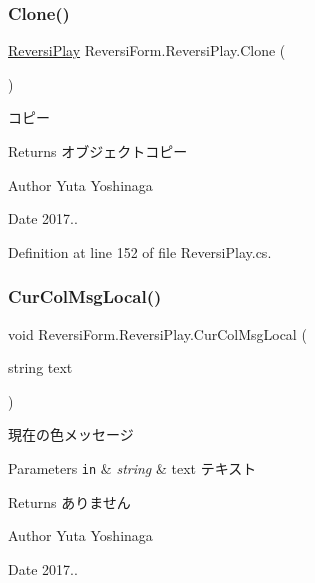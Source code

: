 \subsubsection{\texorpdfstring{Clone()}{Clone()}}
{\footnotesize\ttfamily \hyperlink{class_reversi_form_1_1_reversi_play}{Reversi\+Play} Reversi\+Form.\+Reversi\+Play.\+Clone (\begin{DoxyParamCaption}{ }\end{DoxyParamCaption})}



コピー 

\begin{DoxyReturn}{Returns}
オブジェクトコピー 
\end{DoxyReturn}
\begin{DoxyAuthor}{Author}
Yuta Yoshinaga 
\end{DoxyAuthor}
\begin{DoxyDate}{Date}
2017.. 
\end{DoxyDate}


Definition at line 152 of file Reversi\+Play.\+cs.

\mbox{\label{class_reversi_form_1_1_reversi_play_a9b4d5bd01207c648cc80f018fbba9519}} 
\subsubsection{\texorpdfstring{Cur\+Col\+Msg\+Local()}{CurColMsgLocal()}}
{\footnotesize\ttfamily void Reversi\+Form.\+Reversi\+Play.\+Cur\+Col\+Msg\+Local (\begin{DoxyParamCaption}\item[{string}]{text }\end{DoxyParamCaption})\hspace{0.3cm}{\ttfamily [private]}}



現在の色メッセージ 


\begin{DoxyParams}[1]{Parameters}
\mbox{\tt in}  & {\em string} & text テキスト \\
\hline
\end{DoxyParams}
\begin{DoxyReturn}{Returns}
ありません 
\end{DoxyReturn}
\begin{DoxyAuthor}{Author}
Yuta Yoshinaga 
\end{DoxyAuthor}
\begin{DoxyDate}{Date}
2017.. 
\end{DoxyDate}


